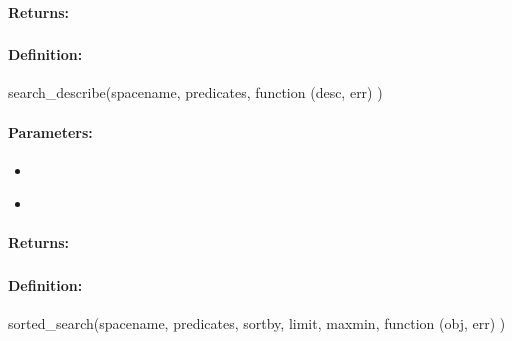 \paragraph{Returns:}


\pagebreak
\subsubsection{}
\label{api:nodejs:search_describe}


\paragraph{Definition:}
\begin{javascriptcode}
search_describe(spacename, predicates, function (desc, err) {})
\end{javascriptcode}
\paragraph{Parameters:}
\begin{itemize}[noitemsep]
\item {}\\

\item {}\\

\end{itemize}

\paragraph{Returns:}


\pagebreak
\subsubsection{}
\label{api:nodejs:sorted_search}


\paragraph{Definition:}
\begin{javascriptcode}
sorted_search(spacename, predicates, sortby, limit, maxmin, function (obj, err) {})
\end{javascriptcode}
